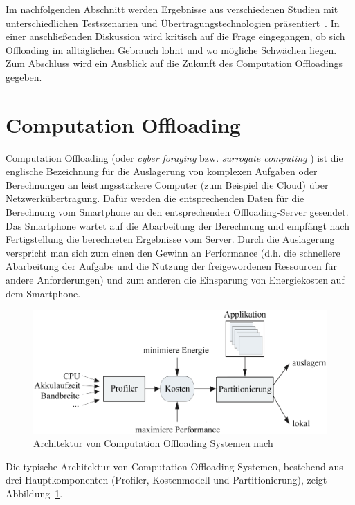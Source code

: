 \documentclass{sigchi}
\begin{document}
Im nachfolgenden Abschnitt werden Ergebnisse aus verschiedenen Studien mit unterschiedlichen Testszenarien und Übertragungstechnologien präsentiert~\cite{o2, o8, o12, thinkair}.
In einer anschließenden Diskussion wird kritisch auf die Frage eingegangen, ob sich Offloading im alltäglichen Gebrauch lohnt und wo mögliche Schwächen liegen.
Zum Abschluss wird ein Ausblick auf die Zukunft des Computation Offloadings gegeben.

\section{Computation Offloading}

Computation Offloading (oder \emph{cyber foraging} bzw. \emph{surrogate computing} \cite{o4}) ist die englische Bezeichnung für die Auslagerung von komplexen Aufgaben oder Berechnungen an leistungsstärkere Computer (zum Beispiel die Cloud) über Netzwerkübertragung.
Dafür werden die entsprechenden Daten für die Berechnung vom Smartphone an den entsprechenden Offloading-Server gesendet.
Das Smartphone wartet auf die Abarbeitung der Berechnung und empfängt nach Fertigstellung die berechneten Ergebnisse vom Server.
Durch die Auslagerung verspricht man sich zum einen den Gewinn an Performance (d.h. die schnellere Abarbeitung der Aufgabe und die Nutzung der freigewordenen Ressourcen für andere Anforderungen) und zum anderen die Einsparung von Energiekosten auf dem Smartphone.

\begin{figure}
\centering
  \includegraphics[width=1.0\columnwidth]{images/architektur}
  \caption{Architektur von Computation Offloading Systemen nach~\protect\cite{O13}}\label{fig:architektur}
\end{figure}

Die typische Architektur von Computation Offloading Systemen, bestehend aus drei Hauptkomponenten (Profiler, Kostenmodell und Partitionierung), zeigt Abbildung~\ref{fig:architektur}.
\end{document}
